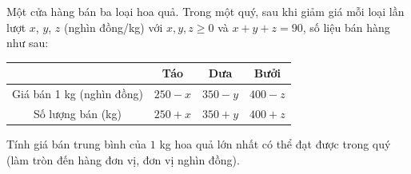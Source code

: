 \begin{ex}
Một cửa hàng bán ba loại hoa quả. Trong một quý, sau khi giảm giá mỗi loại lần lượt $x$, $y$, $z$ (nghìn đồng/kg) với $x,y,z\ge0$ và $x+y+z=90$, số liệu bán hàng như sau:
\begin{center}
\begin{tabular}{|c|c|c|c|}\hline
 & Táo & Dưa & Bưởi\\\hline
Giá bán 1 kg (nghìn đồng) & $250-x$ & $350-y$ & $400-z$\\\hline
Số lượng bán (kg) & $250+x$ & $350+y$ & $400+z$\\\hline
\end{tabular}
\end{center}
Tính giá bán trung bình của $1$ kg hoa quả lớn nhất có thể đạt được trong quý (làm tròn đến hàng đơn vị, đơn vị nghìn đồng).
\end{ex}
